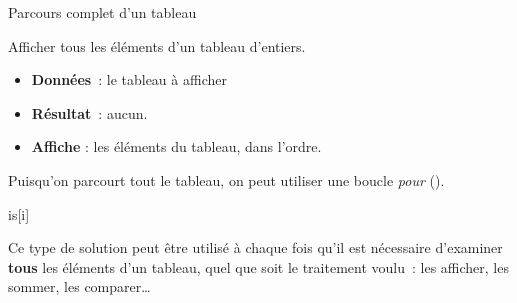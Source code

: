 \begin{Fiche}{Parcours complet d’un tableau}
\label{fiche:tab-parcours-complet}

	Afficher tous les éléments d’un tableau d’entiers.

	
	\begin{itemize}
	\item \textbf{Données}~: le tableau à afficher
	\item \textbf{Résultat}~: aucun.
	\item \textbf{Affiche} : les éléments du tableau, dans l'ordre.
	\end{itemize}


	Puisqu’on parcourt tout le tableau, on peut utiliser une boucle \emph{pour}
	().
	
	\begin{pseudocode}
				\Write is[i]
			\EndFor
		\EndAlgo
	\end{pseudocode}


	Ce type de solution peut être utilisé à chaque fois qu’il est nécessaire
	d'examiner \textbf{tous} les éléments d’un tableau, quel que soit le
	traitement voulu~: les afficher, les sommer, les comparer\dots
	
	
\end{Fiche}
